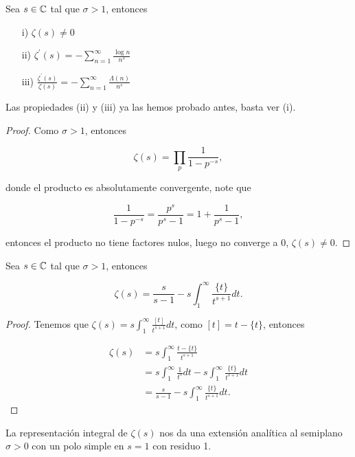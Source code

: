 \begin{theorem}[Propiedades]
Sea $s\in\mathbb{C}$ tal que $\sigma>1$, entonces

\begin{itemize}[]
\item[i)] $\zeta(s)\neq 0$
\item[ii)] $\displaystyle\zeta^{\prime}(s)=-\sum_{n=1}^{\infty} \frac{\log n}{n^s}$
\item[iii)] $\displaystyle\frac{\zeta^{\prime}(s)}{\zeta(s)}=-\sum_{n=1}^{\infty} \frac{\Lambda(n)}{n^s}$
\end{itemize}
\end{theorem}

Las propiedades (ii) y (iii) ya las hemos probado antes, basta ver (i).\\

\begin{proof}
Como $\sigma>1$, entonces

$$\zeta(s)=\prod_p  \frac{1}{1-p^{-s}},$$

donde el producto es absolutamente convergente, note que

$$\frac{1}{1-p^{-s}}=\frac{p^s}{p^s-1}=1+\frac{1}{p^s-1},$$

entonces el producto no tiene factores nulos, luego no converge a 0, $\zeta(s)\neq 0$.
\end{proof}

\begin{theorem}
Sea $s\in \mathbb{C}$ tal que $\sigma>1$, entonces

$$\zeta(s)=\frac{s}{s-1}-s\int_1^{\infty}\frac{\{t\}}{t^{s+1}}dt.$$
\end{theorem}

\begin{proof}
Tenemos que $\zeta(s)=\displaystyle s\int_1^{\infty}\frac{[t]}{t^{s+1}}dt$, como $[t]=t-\{t\}$, entonces

\begin{align*}
\zeta(s)&=s\int_1^{\infty}\frac{t-\{t\}}{t^{s+1}}\\
&=s\int_1^{\infty}\frac{1}{t^s}dt-s\int_1^{\infty}\frac{\{t\}}{t^{s+1}}dt\\
&=\frac{s}{s-1}-s\int_1^{\infty}\frac{\{t\}}{t^{s+1}}dt.
\end{align*}
\end{proof}

\begin{theorem}
La representación integral de $\zeta(s)$ nos da una extensión analítica al semiplano $\sigma>0$ con un polo simple en $s=1$ con residuo 1.
\end{theorem}

